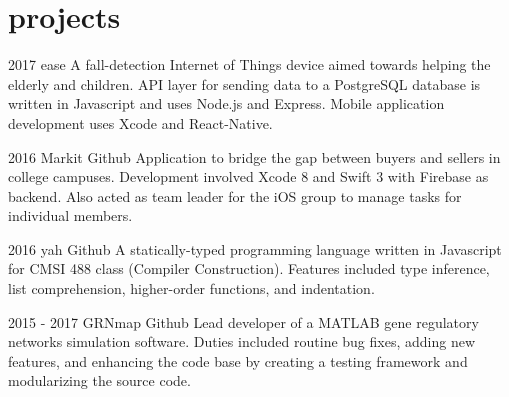 \documentclass[]{friggeri-cv} %
\begin{document}

\section{projects}

  \begin{entrylist}
  


    \entry
      {2017}
      {ease}
      {}
      {A fall-detection Internet of Things device aimed towards helping the elderly and children. API layer for sending data to a PostgreSQL database is written in Javascript and uses Node.js and Express. Mobile application development uses Xcode and React-Native.}


    \entry
      {2016}
      {Markit}
      {Github}
      {Application to bridge the gap between buyers and sellers in college campuses. Development involved Xcode 8 and Swift 3 with Firebase as backend. Also acted as team leader for the iOS group to manage tasks for individual members.}

    
    \entry
      {2016}
      {yah}
      {Github}
      {A statically-typed programming language written in Javascript for CMSI 488 class (Compiler Construction). Features included type inference, list comprehension, higher-order functions, and indentation.}


    \entry
      {2015 - 2017}
      {GRNmap}
      {Github}
      {Lead developer of a MATLAB gene regulatory networks simulation software. Duties included routine bug fixes, adding new features, and enhancing the code base by creating a testing framework and modularizing the source code.}



  
  \end{entrylist}
\end{document}

